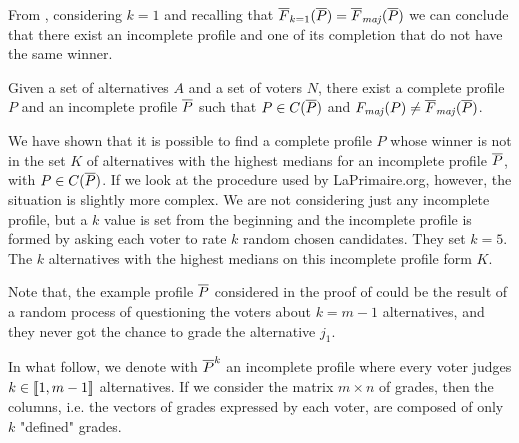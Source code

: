 	From , considering $k=1$ and recalling that $\overline{F}_{k=1}(\Pbar) = \Fmajbar(\Pbar)$ we can conclude that there exist an incomplete profile and one of its completion that do not have the same winner.
	\begin{remark}
		Given a set of alternatives $A$ and a set of voters $N$, there exist a complete profile $P$ and an incomplete profile $\overline{P}$ such that $P \in C(\overline{P})$ and $\Fmaj(P) \neq \Fmajbar(\Pbar)$.
	\end{remark}

	
	We have shown that it is possible to find a complete profile $P$ whose winner is not in the set $K$ of alternatives with the highest medians for an incomplete profile $\overline{P}$, with $P \in C(\overline{P})$.
	If we look at the procedure used by LaPrimaire.org, however, the situation is slightly more complex. We are not considering just any incomplete profile, but a $k$ value is set from the beginning and the incomplete profile is formed by asking each voter to rate $k$ random chosen candidates. They set $k=5$.
	The $k$ alternatives with the highest medians on this incomplete profile form $K$.
	
	Note that, the example profile $\overline{P}$ considered in the proof of  could be the result of a random process of questioning the voters about $k=m-1$ alternatives, and they never got the chance to grade the alternative $j_1$.
	
	In what follow, we denote with $\overline{P}^k$ an incomplete profile where every voter judges $k\in \llbracket1,m-1\rrbracket$ alternatives. If we consider the matrix $m \times n$ of grades, then the columns, i.e. the vectors of grades expressed by each voter, are composed of only $k$ "defined" grades.
	

